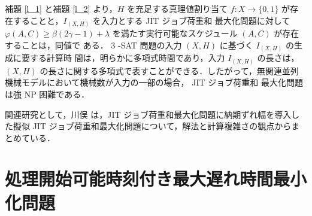 \documentclass[12pt]{optlab-bachelor}
\begin{document}
補題 \ref{l_1} と補題 \ref{l_2} より，$H$ を充足する真理値割り当て $f : X \to \{0,
1\}$ が存在することと，$I_{(X,H)}$ を入力とする JIT ジョブ荷重和
最大化問題に対して $\varphi(A, C) \ge \beta(2\gamma − 1) + \lambda$
を満たす実行可能なスケジュール $(A, C)$ が存在することは，同値で
ある．
3 -SAT 問題の入力 $(X,H)$ に基づく $I_{(X,H)}$ の生成に要する計算時
間は，明らかに多項式時間であり，入力 $I_{(X,H)}$ の長さは，$(X, H)$
の長さに関する多項式で表すことができる．したがって，無関連並列
機械モデルにおいて機械数が入力の一部の場合， JIT ジョブ荷重和
最大化問題は強 NP 困難である．

関連研究として，川俣 \cite{kawamata} は，JIT ジョブ荷重和最大化問題に納期ずれ幅を導入した擬似 JIT ジョブ荷重和最大化問題について，解法と計算複雑さの観点からまとめている．

\section{処理開始可能時刻付き最大遅れ時間最小化問題}\label{3_s_2}
\end{document}
